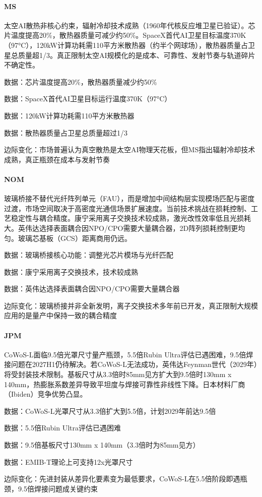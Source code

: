 \documentclass[11pt]{ctexart}
\begin{document}
\paragraph{MS} 太空AI散热非核心约束，辐射冷却技术成熟（1960年代核反应堆卫星已验证）。芯片温度提高20\%，散热器质量可减少约50\%。SpaceX首代AI卫星目标温度370K（97°C），120kW计算功耗需110平方米散热器（约半个网球场），散热器质量占卫星总质量超1/3。真正限制太空AI规模化的是成本、可靠性、发射节奏与轨道碎片不确定性。
{\small\color{refgray}数据：芯片温度提高20\%，散热器质量减少约50\%\par}
{\small\color{refgray}数据：SpaceX首代AI卫星目标运行温度370K（97°C）\par}
{\small\color{refgray}数据：120kW计算功耗需110平方米散热器\par}
{\small\color{refgray}数据：散热器质量占卫星总质量超过1/3\par}
{\small\color{refgray}边际变化：市场普遍认为真空散热是太空AI物理天花板，但MS指出辐射冷却技术成熟，真正瓶颈在成本与发射节奏\par}
\paragraph{NOM} 玻璃桥接不替代光纤阵列单元（FAU），而是增加中间结构层实现模场匹配与密度过渡，市场空间取决于高密度光通信场景扩展速度。当前技术挑战在损耗控制、工艺稳定性与耦合精度。康宁采用离子交换技术较成熟，激光改性效率低且光损耗大。英伟达选择表面耦合因NPO/CPO需要大量耦合器，2D阵列损耗控制更均匀。玻璃芯基板（GCS）距离商用仍远。
{\small\color{refgray}数据：玻璃桥接核心功能：调整光芯片模场与光纤匹配\par}
{\small\color{refgray}数据：康宁采用离子交换技术，技术较成熟\par}
{\small\color{refgray}数据：英伟达选择表面耦合因NPO/CPO需要大量耦合器\par}
{\small\color{refgray}边际变化：玻璃桥接并非全新发明，离子交换技术多年前已开发，真正限制大规模应用的是量产中保持一致的耦合精度\par}
\paragraph{JPM} CoWoS-L面临9.5倍光罩尺寸量产瓶颈，5.5倍Rubin Ultra评估已遇困难，9.5倍焊接问题在2027H1仍待解决。若CoWoS-L无法成功，英伟达Feynman世代（2029年）将受封装技术限制。基板尺寸从3.3倍时85mm见方扩大到9.5倍时130mm x 140mm，热膨胀系数差异导致平坦度与焊接可靠性非线性下降。日本材料厂商（Ibiden）竞争优势凸显。
{\small\color{refgray}数据：CoWoS-L光罩尺寸从3.3倍扩大到5.5倍，计划2029年前达9.5倍\par}
{\small\color{refgray}数据：5.5倍Rubin Ultra评估已遇困难\par}
{\small\color{refgray}数据：9.5倍基板尺寸130mm x 140mm（3.3倍时为85mm见方）\par}
{\small\color{refgray}数据：EMIB-T理论上可支持12x光罩尺寸\par}
{\small\color{refgray}边际变化：先进封装从差异化要素变为最低要求，CoWoS-L在5.5倍阶段即遇瓶颈，9.5倍焊接问题成关键约束\par}
\end{document}
